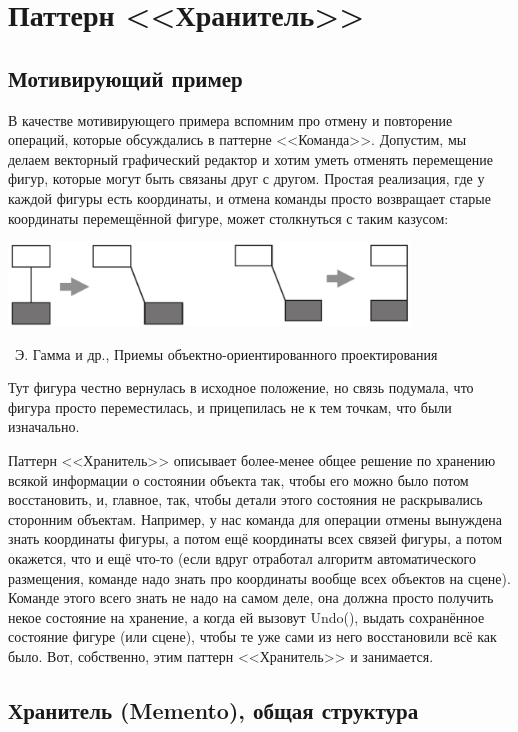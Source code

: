 \documentclass[a5paper]{article}
\newcommand{\attribution}[1] {
    \vspace{-5mm}\begin{flushright}\begin{scriptsize}%
    {\textcopyright\, #1}\end{scriptsize}\end{flushright}
}
\begin{document}
\section{Паттерн <<Хранитель>>}

\subsection{Мотивирующий пример}

В качестве мотивирующего примера вспомним про отмену и повторение операций, которые обсуждались в паттерне <<Команда>>. Допустим, мы делаем векторный графический редактор и хотим уметь отменять перемещение фигур, которые могут быть связаны друг с другом. Простая реализация, где у каждой фигуры есть координаты, и отмена команды просто возвращает старые координаты перемещённой фигуре, может столкнуться с таким казусом:

\begin{center}
    \includegraphics[width=0.8\textwidth]{mementoMotivation.png}
    \attribution{Э. Гамма и др., Приемы объектно-ориентированного проектирования}
\end{center}

Тут фигура честно вернулась в исходное положение, но связь подумала, что фигура просто переместилась, и прицепилась не к тем точкам, что были изначально.

Паттерн <<Хранитель>> описывает более-менее общее решение по хранению всякой информации о состоянии объекта так, чтобы его можно было потом восстановить, и, главное, так, чтобы детали этого состояния не раскрывались сторонним объектам. Например, у нас команда для операции отмены вынуждена знать координаты фигуры, а потом ещё координаты всех связей фигуры, а потом окажется, что и ещё что-то (если вдруг отработал алгоритм автоматического размещения, команде надо знать про координаты вообще всех объектов на сцене). Команде этого всего знать не надо на самом деле, она должна просто получить некое состояние на хранение, а когда ей вызовут Undo(), выдать сохранённое состояние фигуре (или сцене), чтобы те уже сами из него восстановили всё как было. Вот, собственно, этим паттерн <<Хранитель>> и занимается.

\subsection{Хранитель (Memento), общая структура}
\end{document}
